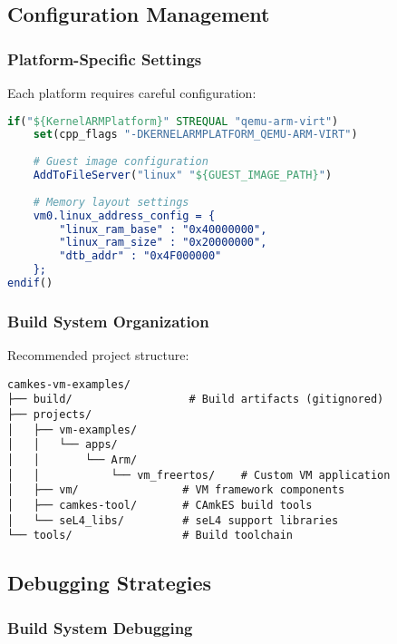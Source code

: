 \documentclass[11pt,a4paper]{article}
\begin{document}
\subsection{Configuration Management}

\subsubsection{Platform-Specific Settings}

Each platform requires careful configuration:

\begin{lstlisting}[language=cmake, caption=Platform Configuration]
if("${KernelARMPlatform}" STREQUAL "qemu-arm-virt")
    set(cpp_flags "-DKERNELARMPLATFORM_QEMU-ARM-VIRT")
    
    # Guest image configuration
    AddToFileServer("linux" "${GUEST_IMAGE_PATH}")
    
    # Memory layout settings
    vm0.linux_address_config = {
        "linux_ram_base" : "0x40000000",
        "linux_ram_size" : "0x20000000",
        "dtb_addr" : "0x4F000000"
    };
endif()
\end{lstlisting}

\subsubsection{Build System Organization}

Recommended project structure:

\begin{lstlisting}[caption=Project Structure]
camkes-vm-examples/
├── build/                  # Build artifacts (gitignored)
├── projects/
│   ├── vm-examples/
│   │   └── apps/
│   │       └── Arm/
│   │           └── vm_freertos/    # Custom VM application
│   ├── vm/                # VM framework components
│   ├── camkes-tool/       # CAmkES build tools
│   └── seL4_libs/         # seL4 support libraries
└── tools/                 # Build toolchain
\end{lstlisting}

\subsection{Debugging Strategies}

\subsubsection{Build System Debugging}
\end{document}
